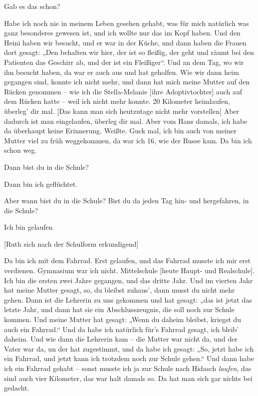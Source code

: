 \documentclass[ngerman,]{article}
\providecommand{\tightlist}{%
  \setlength{\itemsep}{0pt}\setlength{\parskip}{0pt}}
\begin{document}
\begin{multicols}{3}
\begin{description}
\tightlist
\item[Ruth]
Gab es das schon?
\item[Käthe]
Habe ich noch nie in meinem Leben gesehen gehabt, was für mich natürlich
was ganz besonderes gewesen ist, und ich wollte nur das im Kopf haben.
Und den Heini haben wir besucht, und er war in der Küche, und dann haben
die Frauen dort gesagt: „Den behalten wir hier, der ist so fleißig, der
geht und räumt bei den Patienten das Geschirr ab, und der ist ein
Fleißiger“. Und an dem Tag, wo wir ihn besucht haben, da war er auch aus
und hat geholfen. Wie wir dann heim gegangen sind, konnte ich nicht
mehr, und dann hat mich meine Mutter auf den Rücken genommen – wie ich
die Stella-Melanie {[}ihre Adoptivtochter{]} auch auf dem Rücken hatte –
weil ich nicht mehr konnte. 20 Kilometer heimlaufen, überleg' dir mal.
{[}Das kann man sich heutzutage nicht mehr vorstellen{]} Aber dadurch
ist man eingelaufen, überleg dir mal. Aber vom Hans damals, ich habe da
überhaupt keine Erinnerung. Weißte. Guck mal, ich bin auch von meiner
Mutter viel zu früh weggekommen, da war ich 16, wie der Russe kam. Da
bin ich schon weg.
\item[Ruth]
Dann bist du in die Schule?
\item[Käthe]
Dann bin ich geflüchtet.
\item[Ruth]
Aber wann bist du in die Schule? Bist du da jeden Tag hin- und
hergefahren, in die Schule?
\item[Käthe]
Ich bin gelaufen
\end{description}

{[}Ruth sich nach der Schulform erkundigend{]}

\begin{description}
\tightlist
\item[Käthe]
Da bin ich mit dem Fahrrad. Erst gelaufen, und das Fahrrad musste ich
mir erst verdienen. Gymnasium war ich nicht. Mittelschule {[}heute
Haupt- und Realschule{]}. Ich bin die ersten zwei Jahre gegangen, und
das dritte Jahr. Und im vierten Jahr hat meine Mutter gesagt, so, du
bleibst zuhaus', dann musst du nicht mehr gehen. Dann ist die Lehrerin
zu uns gekommen und hat gesagt: „das ist jetzt das letzte Jahr, und dann
hat sie ein Abschlusszeugnis, die soll noch zur Schule kommen. Und meine
Mutter hat gesagt: „Wenn du daheim bleibst, kriegst du auch ein
Fahrrad.“ Und da habe ich natürlich für's Fahrrad gesagt, ich bleib'
daheim. Und wie dann die Lehrerin kam – die Mutter war nicht da, und der
Vater war da, un der hat zugestimmt, und da habe ich gesagt: „So, jetzt
habe ich ein Fahrrad, und jetzt kann ich trotzdem noch zur Schule
gehen.“ Und dann habe ich ein Fahrrad gehabt – sonst musste ich ja zur
Schule nach Hidasch \emph{laufen}, das sind auch vier Kilometer, das war
halt damals so. Da hat man sich gar nichts bei gedacht.
\end{description}


\end{multicols}
\end{document}
